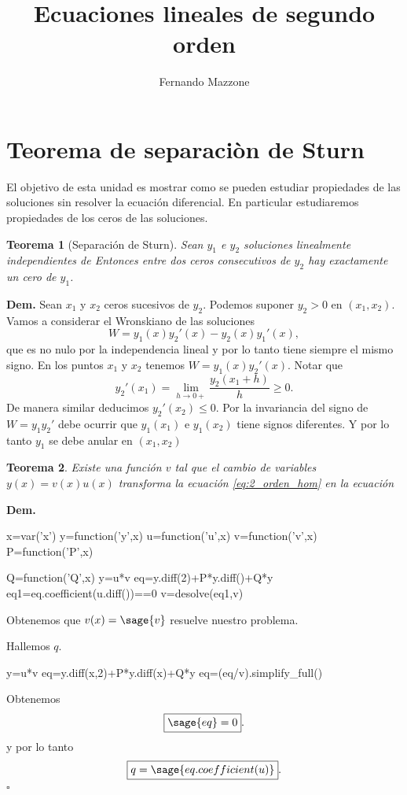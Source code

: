 \documentclass{article}
\title{Ecuaciones lineales de segundo orden}
\author{Fernando Mazzone}
\newtheorem{teorema}{Teorema}[section]
\newcommand{\qed}{$\square$}
\begin{document}
\section{Teorema de separaciòn de Sturn}

El objetivo  de esta unidad es mostrar como se pueden estudiar propiedades de las soluciones sin resolver la ecuación diferencial. En particular estudiaremos propiedades de  los ceros de las soluciones.

\begin{teorema}[Separación de Sturn] Sean $y_1$ e $y_2$ soluciones linealmente independientes de 
Entonces entre dos ceros consecutivos de $y_2$ hay exactamente un cero de $y_1$. \end{teorema}
\textbf{Dem.} Sean $x_1$ y $x_2$ ceros sucesivos de $y_2$. Podemos suponer $y_2>0$ en $(x_1,x_2)$. Vamos a considerar el Wronskiano de las soluciones
\[W=y_1(x)y_2'(x)-y_2(x)y_1'(x),\]
que es no nulo por la independencia lineal y por lo tanto tiene siempre el  mismo signo. En los puntos $x_1$ y $x_2$ tenemos $W=y_1(x)y_2'(x)$. Notar que
\[y_2'(x_1)=\lim_{h\to 0+}\frac{y_2(x_1+h)}{h}\geq 0.\]
De  manera similar deducimos $y_2'(x_2)\leq 0$. Por la invariancia del signo de $W=y_1y_2'$ debe ocurrir que $y_1(x_1)$ e $y_1(x_2)$ tiene signos diferentes. Y por lo tanto $y_1$ se debe anular en $(x_1,x_2)$

\begin{teorema} Existe una función $v$ tal que el cambio de variables $y(x)=v(x)u(x)$ transforma la ecuación \eqref{eq:2_orden_hom} en la ecuación
\end{teorema}
\textbf{Dem.} 
\begin{sageblock}
x=var('x')
y=function('y',x)
u=function('u',x)
v=function('v',x)
P=function('P',x)

Q=function('Q',x)
y=u*v
eq=y.diff(2)+P*y.diff()+Q*y
eq1=eq.coefficient(u.diff())==0
v=desolve(eq1,v)
\end{sageblock}
Obtenemos que $v(x)=\sage{v}$ resuelve nuestro problema.

Hallemos $q$.

\begin{sageblock}
y=u*v
eq=y.diff(x,2)+P*y.diff(x)+Q*y
eq=(eq/v).simplify_full()
\end{sageblock}
Obtenemos
\[\boxed{\sage{eq}=0}.\]
y por lo tanto
\[\boxed{q=\sage{eq.coefficient(u)}}.\]
\qed
\end{document}
